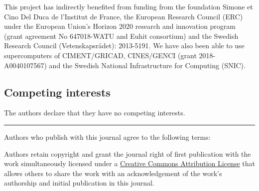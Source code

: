 This project has indirectly benefited from funding from the foundation Simone et
Cino Del Duca de l'Institut de France, the European Research Council (ERC)
under the European Union's Horizon 2020 research and innovation program (grant
agreement No 647018-WATU and Euhit consortium) and the Swedish Research Council
(Vetenskapsr{\aa}det): 2013-5191.
%
We have also been able to use supercomputers of CIMENT/GRICAD, CINES/GENCI
(grant 2018-A0040107567) and the Swedish National Infrastructure for Computing
(SNIC).

\subsection*{Competing interests}


The authors declare that they have no competing interests.




\vspace{10pt}
\hrule
\vspace{10pt}


Authors who publish with this journal agree to the following terms:

Authors retain copyright and grant the journal right of first publication with
the work simultaneously licensed under a
\href{http://creativecommons.org/licenses/by/3.0/}{Creative Commons Attribution
License} that allows others to share the work with an acknowledgement of the
work's authorship and initial publication in this journal.

